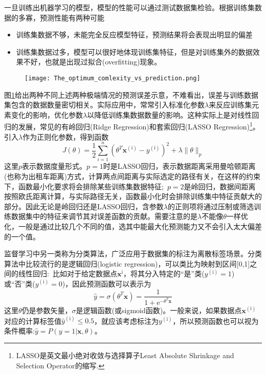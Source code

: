 一旦训练出机器学习的模型，模型的性能可以通过测试数据集检验。根据训练集数据的多寡，预测性能有两种可能
\begin{itemize}
	\item 训练集数据不够，未能完全反应模型特征，预测结果将会表现出明显的偏差
	\item 训练集数据过多，模型可以很好地体现训练集特征，但是对训练集外的数据效果不好，也就是出现过拟合\textrm{(overfitting)}现象。
\end{itemize}
\begin{figure}[h!]
\centering
\vspace*{-0.1in}
\texttt{[image: The\_optimum\_comlexity\_vs\_prediction.png]}
\caption{\fontsize{7.2pt}{4.2pt}}%
\label{ML_Fitting_Error}
\end{figure}
图\ref{ML_Fitting_Error}给出两种不同上述两种极端情况的预测误差示意，不难看出，误差与训练数据集包含的数据数量密切相关。实际应用中，常常引入标准化参数$\lambda$来反应训练集元素变化的影响，优化参数$\lambda$以降低训练集数据数量的影响。这种实际上是对线性回归的发展，常见的有岭回归\textrm{(Ridge Regression)}和套索回归\textrm{(LASSO Regression)}\footnote{\textrm{LASSO}是英文最小绝对收敛与选择算子\textrm{Least Absolute Shrinkage and Selection Operator}的缩写.}。引入$\lambda$作为正则化参数，得到函数
\begin{equation}
	J(\theta)=\dfrac12\sum_{i=1}^n(\theta^T\mathbf{x}^{(\mathrm{i})}-y^{(\mathrm{i})})^2+\lambda\|\theta\|_p
	\label{eq:Ridge_LASSO}
\end{equation}
这里$p$表示数据度量形式。$p=1$时是\textrm{LASSO}回归，表示数据距离采用曼哈顿距离(也称为出租车距离)方式，计算两点间距离与实际选定的路径有关，在这样的约束下，函数最小化要求将会排除某些训练集数据特征;~$p=2$是岭回归，数据间距离按照欧氏距离计算，与实际路径无关，函数最小化时会排除训练集中特征贡献大的部分。因此无论是岭回归还是\textrm{LASSO}回归，含参数$\lambda$的正则项将通过压制或筛选训练数据集中的特征来调节其对误差函数的贡献。需要注意的是$\lambda$不能像$\theta$一样优化，一般是通过比较几个不同的值，选其中能最大化预测能力又不会引入太大偏差的一个值。

监督学习中另一类称为分类算法，广泛应用于数据集的标注为离散标签场景。分类算法中比较流行的是逻辑回归\textrm{(logistic regression)}，可以类比为映射到区间[0,1]之间的线性回归:~比如对于给定数据点$\mathbf{x}^{\mathrm{i}}$，将其分入特定的“是”类($y^{\mathrm{(i)}}=1$)或“否”类($y^{\mathrm{(i)}}=0$)，因此预测函数可以表示为
\begin{equation}
	\hat y=\sigma(\theta^T\mathbf{x})=\dfrac1{1+\mathrm{e}^{-\theta^T\mathbf{x}}}
	\label{eq:logstical_y}
\end{equation}
这里$\theta$仍是参数矢量，$\sigma$是逻辑函数(或\textrm{sigmoid}函数)。一般来说，如果数据点$\mathbf{x}^{(\mathrm{i})}$对应的计算标签值$\hat{y}^{(\mathrm{i})}\leqslant0.5$，就应该考虑标注为$y^{(\mathrm{i})}$，所以预测函数也可以视为条件概率:$\hat{y}=P(y=1|\mathbf{x},\theta)$。

